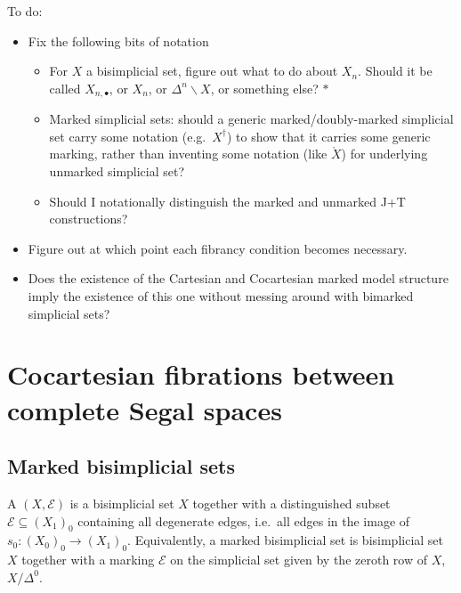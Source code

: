 \documentclass[main.tex]{subfiles}
\begin{document}
To do:
\begin{itemize}
  \item Fix the following bits of notation
    \begin{itemize}
      \item For $X$ a bisimplicial set, figure out what to do about $X_{n}$. Should it be called $X_{n, \bullet}$, or $X_{n}$, or $\Delta^{n} \backslash X$, or something else? $\ast$

      \item Marked simplicial sets: should a generic marked/doubly-marked simplicial set carry some notation (e.g.\ $X^{\dagger}$) to show that it carries some generic marking, rather than inventing some notation (like $\mathring{X}$) for underlying unmarked simplicial set?

      \item Should I notationally distinguish the marked and unmarked J+T constructions?
    \end{itemize}

  \item Figure out at which point each fibrancy condition becomes necessary.

  \item Does the existence of the Cartesian and Cocartesian marked model structure imply the existence of this one without messing around with bimarked simplicial sets?
\end{itemize}

\section{Cocartesian fibrations between complete Segal spaces}
\label{sec:cocartesian_fibrations_between_complete_segal_spaces}

\subsection{Marked bisimplicial sets}
\label{ssc:marked_bisimplicial_sets}

\begin{definition}
  A  $(X, \mathcal{E})$ is a bisimplicial set $X$ together with a distinguished subset $\mathcal{E} \subseteq (X_{1})_{0}$ containing all degenerate edges, i.e.\ all edges in the image of $s_{0}\colon (X_{0})_{0} \to (X_{1})_{0}$. Equivalently, a marked bisimplicial set is bisimplicial set $X$ together with a marking $\mathcal{E}$ on the simplicial set given by the zeroth row of $X$, $X / \Delta^{0}$.
\end{definition}
\end{document}
